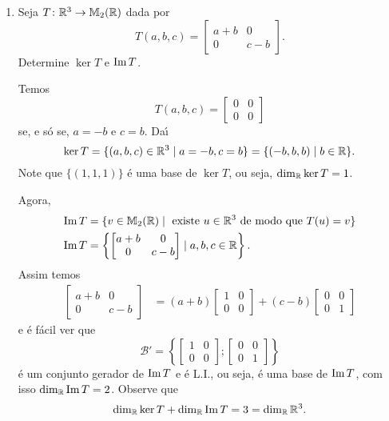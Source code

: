 \begin{exemplos}
  \begin{enumerate}[label={\arabic*})]
    \item Seja $T \colon \mathbb{R}^3 \to \mathbb{M}_2(\mathbb{R})$ dada por
    \[
      T(a,b,c) = \begin{bmatrix}
        a + b & 0\\
        0 & c - b
      \end{bmatrix}.
    \]
    Determine $\ker T$ e ${\rm Im\,} T$.
    \begin{solucao}
      Temos
      \[
        T(a,b,c) = \begin{bmatrix}
          0 & 0\\
          0 & 0
        \end{bmatrix}
      \]
      se, e s\'o se, $a = -b$ e $c = b$. Da{\'\i}
      \[
        \ker T = \{(a,b,c) \in \mathbb{R}^3 \mid a = -b, c = b\} = \{(-b,b,b) \mid b \in \mathbb{R}\}.
      \]
      Note que $\{(1,1,1)\}$ \'e uma base de $\ker T$, ou seja, $\dim_{\mathbb{R}} \ker T = 1$.

      Agora,
      \begin{align*}
        {\rm Im\,} T &= \{v \in \mathbb{M}_2(\mathbb{R}) \mid \mbox{ existe } u \in \mathbb{R}^3 \mbox{ de modo que } T(u) = v\}\\
        {\rm Im\,} T &= \left\{ \begin{bmatrix}
          a + b & 0\\
          0 & c - b
        \end{bmatrix} \mid a, b, c \in \mathbb{R}\right\}.
      \end{align*}
      Assim temos
      \begin{align*}
        \begin{bmatrix}
          a + b & 0\\
          0 & c - b
        \end{bmatrix} &= (a + b) \begin{bmatrix}
          1 & 0\\ 0 & 0
        \end{bmatrix} + (c - b) \begin{bmatrix}
          0 & 0\\ 0 & 1
        \end{bmatrix}
      \end{align*}
      e \'e f\'acil ver que
      \[
        \mathcal{B}' = \left\{ \begin{bmatrix}
          1 & 0\\ 0 & 0
        \end{bmatrix}; \begin{bmatrix}
          0 & 0\\ 0 & 1
        \end{bmatrix}\right\}
      \]
      \'e um conjunto gerador de ${\rm Im\,} T$ e \'e L.I., ou seja, \'e uma base de ${\rm Im\,} T$, com isso $\dim_{\mathbb{R}}{\rm Im\,} T = 2$. Observe que
      \[
        \dim_{\mathbb{R}}\ker T + \dim_{\mathbb{R}}{\rm Im\,} T = 3 = \dim_{\mathbb{R}}\mathbb{R}^3.
      \]
    \end{solucao}


\end{enumerate}
\end{exemplos}
